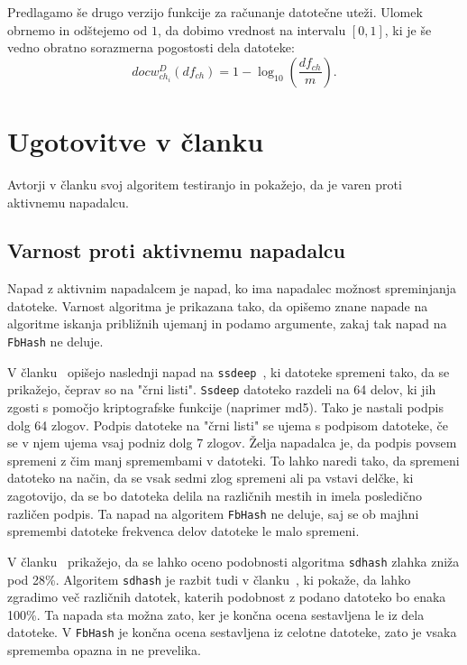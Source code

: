 \documentclass{acm_proc_article-sp}
\begin{document}
Predlagamo še drugo verzijo funkcije za računanje datotečne uteži. Ulomek obrnemo in odštejemo od $1$, da dobimo vrednost na intervalu $[0, 1]$, ki je še vedno obratno sorazmerna pogostosti dela datoteke:
\[ docw_{ch_i}^{D}(df_{ch}) = 1 - \log_{10}\left(\frac{df_{ch}}{m}\right).\]

\section{Ugotovitve v \v{c}lanku}

Avtorji v članku svoj algoritem testiranjo in pokažejo, da je varen proti aktivnemu napadalcu.

\subsection{Varnost proti aktivnemu napadalcu}

Napad z aktivnim napadalcem je napad, ko ima napadalec možnost spreminjanja datoteke. Varnost algoritma je prikazana tako, da opišemo znane napade na algoritme iskanja približnih ujemanj in podamo argumente, zakaj tak napad na \texttt{FbHash} ne deluje.

V članku~\cite{5931110} opišejo naslednji napad na \texttt{ssdeep}~\cite{kornblum:ctph}, ki datoteke spremeni tako, da se prikažejo, čeprav so na "črni listi". \texttt{Ssdeep} datoteko razdeli na 64 delov, ki jih zgosti s pomočjo kriptografske funkcije (naprimer md5). Tako je nastali podpis dolg 64 zlogov. Podpis datoteke na "črni listi" se ujema s podpisom datoteke, če se v njem ujema vsaj podniz dolg 7 zlogov. Želja napadalca je, da podpis povsem spremeni z čim manj spremembami v datoteki. To lahko naredi tako, da spremeni datoteko na način, da se vsak sedmi zlog spremeni ali pa vstavi delčke, ki zagotovijo, da se bo datoteka delila na različnih mestih in imela posledično različen podpis. Ta napad na algoritem \texttt{FbHash} ne deluje, saj se ob majhni spremembi datoteke frekvenca delov datoteke le malo spremeni.

V članku~\cite{breitinger2012security} prikažejo, da se lahko oceno podobnosti algoritma \texttt{sdhash} zlahka zniža pod 28\%. Algoritem \texttt{sdhash} je razbit tudi v članku~\cite{chang2015collision}, ki pokaže, da lahko zgradimo več različnih datotek, katerih podobnost z podano datoteko bo enaka 100\%. Ta napada sta možna zato, ker je končna ocena sestavljena le iz dela datoteke. V \texttt{FbHash} je končna ocena sestavljena iz celotne datoteke, zato je vsaka sprememba opazna in ne prevelika. 
\end{document}
